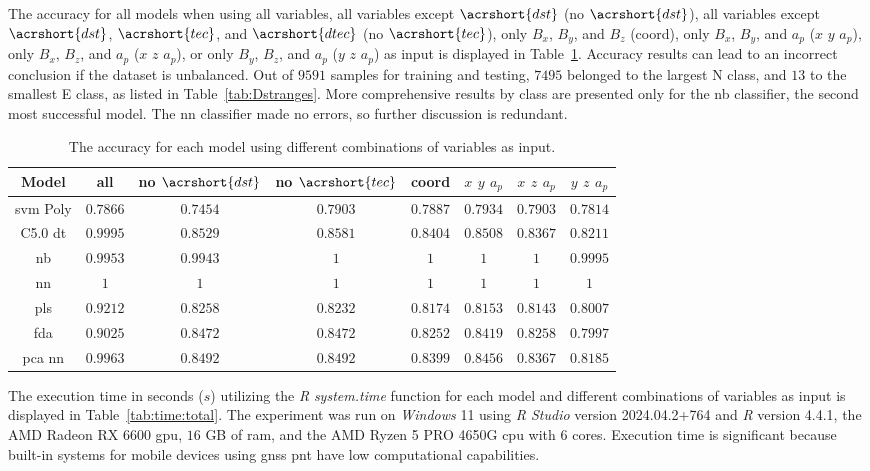 \documentclass[sn-mathphys-num]{sn-jnl}%
\begin{document}
The accuracy for all models when using all variables, all variables except $\acrshort{dst}$ (no $\acrshort{dst}$), all variables except $\acrshort{dst}$, $\acrshort{tec}$, and $\acrshort{dtec}$ (no $\acrshort{tec}$), only $B_{x}$, $B_{y}$, and $B_{z}$ (coord), only $B_{x}$, $B_{y}$, and $a_{p}$ ($x$ $y$ $a_{p}$), only $B_{x}$, $B_{z}$, and $a_{p}$ ($x$ $z$ $a_{p}$), or only $B_{y}$, $B_{z}$, and $a_{p}$ ($y$ $z$ $a_{p}$) as input is displayed in Table~\ref{tab:acc:all}. Accuracy results can lead to an incorrect conclusion if the dataset is unbalanced. Out of $9591$ samples for training and testing, $7495$ belonged to the largest N class, and $13$ to the smallest E class, as listed in Table~\ref{tab:Dstranges}. More comprehensive results by class are presented only for the \acrfull{nb} classifier, the second most successful model. The \acrfull{nn} classifier made no errors, so further discussion is redundant.

\begin{table}[!ht]
    \centering
    \caption{The accuracy for each model using different combinations of variables as input.}
	\label{tab:acc:all}
	\begin{tabular}{|c|c|c|c|c|c|c|c|}
		\hline
		Model & all & no $\acrshort{dst}$ & no $\acrshort{tec}$ & coord & $x$ $y$ $a_{p}$ & $x$ $z$ $a_{p}$ & $y$ $z$ $a_{p}$ \\ \hline
		\acrshort{svm} Poly & $0.7866$ & $0.7454$ & $0.7903$ & $0.7887$ & $0.7934$ & $0.7903$ & $0.7814$ \\ \hline
		C5.0 \acrshort{dt} & $0.9995$ & $0.8529$ & $0.8581$ & $0.8404$ & $0.8508$ & $0.8367$ & $0.8211$ \\ \hline
		\acrshort{nb} & $0.9953$ & $0.9943$ & $1$ & $1$ & $1$ & $1$ & $0.9995$ \\ \hline
		\acrshort{nn} & $1$ & $1$ & $1$ & $1$ & $1$ & $1$ & $1$ \\ \hline
		\acrshort{pls} & $0.9212$ & $0.8258$ & $0.8232$ & $0.8174$ & $0.8153$ & $0.8143$ & $0.8007$ \\ \hline
		\acrshort{fda} & $0.9025$ & $0.8472$ & $0.8472$ & $0.8252$ & $0.8419$ & $0.8258$ & $0.7997$ \\ \hline
		\acrshort{pca} \acrshort{nn} & $0.9963$ & $0.8492$ & $0.8492$ & $0.8399$ & $0.8456$ & $0.8367$ & $0.8185$ \\ \hline
	\end{tabular}
\end{table}

The execution time in seconds ($s$) utilizing the \textit{R} \textit{system.time} function \cite{system.time2024} for each model and different combinations of variables as input is displayed in Table~\ref{tab:time:total}. The experiment was run on \textit{Windows} 11 using \textit{R Studio} version 2024.04.2+764 and \textit{R} version 4.4.1, the AMD Radeon RX 6600 \acrfull{gpu}, $16$ GB of \acrfull{ram}, and the AMD Ryzen 5 PRO 4650G \acrfull{cpu} with $6$ cores. Execution time is significant because built-in systems for mobile devices using \acrshort{gnss} \acrshort{pnt} have low computational capabilities.
\end{document}
